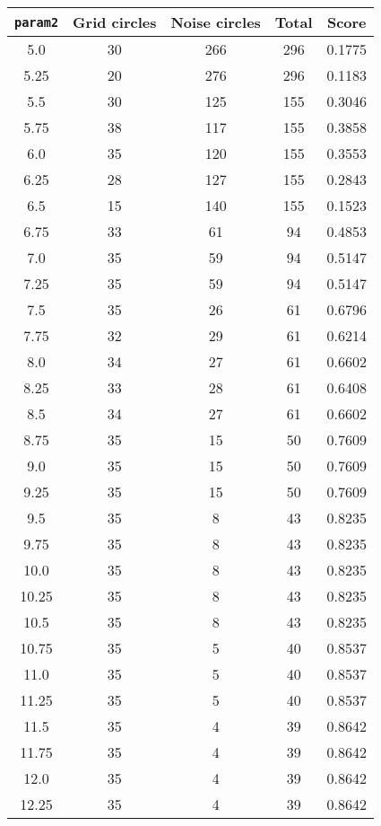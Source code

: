 \documentclass[letterpaper, 12pt]{article}
\begin{document}
\begin{longtable}{|c|c|c|c|c|}
\hline
\textbf{\texttt{param2}} & \textbf{Grid circles} & \textbf{Noise circles} & \textbf{Total} & \textbf{Score} \\
\hline
5.0 & 30 & 266 & 296 & 0.1775 \\
\hline
5.25 & 20 & 276 & 296 & 0.1183 \\
\hline
5.5 & 30 & 125 & 155 & 0.3046 \\
\hline
5.75 & 38 & 117 & 155 & 0.3858 \\
\hline
6.0 & 35 & 120 & 155 & 0.3553 \\
\hline
6.25 & 28 & 127 & 155 & 0.2843 \\
\hline
6.5 & 15 & 140 & 155 & 0.1523 \\
\hline
6.75 & 33 & 61 & 94 & 0.4853 \\
\hline
7.0 & 35 & 59 & 94 & 0.5147 \\
\hline
7.25 & 35 & 59 & 94 & 0.5147 \\
\hline
7.5 & 35 & 26 & 61 & 0.6796 \\
\hline
7.75 & 32 & 29 & 61 & 0.6214 \\
\hline
8.0 & 34 & 27 & 61 & 0.6602 \\
\hline
8.25 & 33 & 28 & 61 & 0.6408 \\
\hline
8.5 & 34 & 27 & 61 & 0.6602 \\
\hline
8.75 & 35 & 15 & 50 & 0.7609 \\
\hline
9.0 & 35 & 15 & 50 & 0.7609 \\
\hline
9.25 & 35 & 15 & 50 & 0.7609 \\
\hline
9.5 & 35 & 8 & 43 & 0.8235 \\
\hline
9.75 & 35 & 8 & 43 & 0.8235 \\
\hline
10.0 & 35 & 8 & 43 & 0.8235 \\
\hline
10.25 & 35 & 8 & 43 & 0.8235 \\
\hline
10.5 & 35 & 8 & 43 & 0.8235 \\
\hline
10.75 & 35 & 5 & 40 & 0.8537 \\
\hline
11.0 & 35 & 5 & 40 & 0.8537 \\
\hline
11.25 & 35 & 5 & 40 & 0.8537 \\
\hline
11.5 & 35 & 4 & 39 & 0.8642 \\
\hline
11.75 & 35 & 4 & 39 & 0.8642 \\
\hline
12.0 & 35 & 4 & 39 & 0.8642 \\
\hline
12.25 & 35 & 4 & 39 & 0.8642 \\
\hline

\end{longtable}
\end{document}
